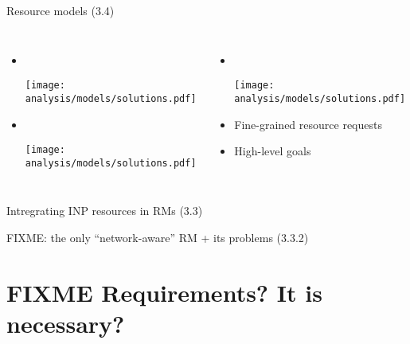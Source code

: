 \begin{frame}{Resource models (3.4)}
  \begin{columns}[T,onlytextwidth]
      \begin{itemize}
        \item {}\\
        \begin{center}
          \texttt{[image: analysis/models/solutions.pdf]}
        \end{center}
        \item {}\\
        \begin{center}
          \texttt{[image: analysis/models/solutions.pdf]}
        \end{center}
      \end{itemize}

      \begin{itemize}
        \item {}\\
        \begin{center}
          \texttt{[image: analysis/models/solutions.pdf]}
        \end{center}
        \item Fine-grained resource requests
        \item High-level goals
      \end{itemize}
  \end{columns}
\end{frame}
\begin{frame}{Intregrating INP resources in RMs}
  (3.3)
\end{frame}
\begin{frame}{FIXME: the only “network-aware” RM + its problems}
  (3.3.2)
\end{frame}

\section{FIXME Requirements? It is necessary?}

